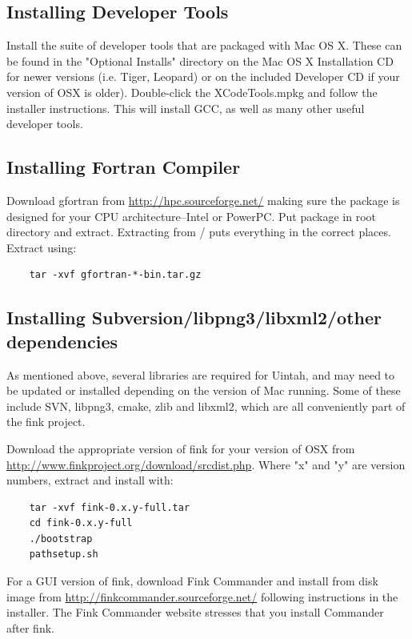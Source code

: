 \documentclass[12pt]{article}
\begin{document}
\subsection{Installing Developer Tools}
Install the suite of developer tools that are packaged with Mac OS X.
These can be found in the "Optional Installs" directory on the Mac OS
X Installation CD for newer versions (i.e. Tiger, Leopard) or on the
included Developer CD if your version of OSX is older).  Double-click
the XCodeTools.mpkg and follow the installer instructions.  This will
install GCC, as well as many other useful developer tools.

\subsection{Installing Fortran Compiler}
Download gfortran from \url{http://hpc.sourceforge.net/} making sure
the package is designed for your CPU architecture--Intel or PowerPC.
Put package in root directory and extract.  Extracting from / puts
everything in the correct places.  Extract using:

\begin{verbatim}
	tar -xvf gfortran-*-bin.tar.gz
\end{verbatim}

\subsection{Installing Subversion/libpng3/libxml2/other dependencies}
As mentioned above, several libraries are required for Uintah, and may
need to be updated or installed depending on the version of Mac
running.  Some of these include SVN, libpng3, cmake, zlib and libxml2,
which are all conveniently part of the fink project.

Download the appropriate version of fink for your version of OSX from
\url{http://www.finkproject.org/download/srcdist.php}.  Where "x" and
"y" are version numbers, extract and install with:

\begin{verbatim}
	tar -xvf fink-0.x.y-full.tar 
	cd fink-0.x.y-full
	./bootstrap 
	pathsetup.sh
\end{verbatim}

For a GUI version of fink, download Fink Commander and install from
disk image from \url{http://finkcommander.sourceforge.net/} following
instructions in the installer.  The Fink Commander website stresses
that you install Commander after fink.
\end{document}
